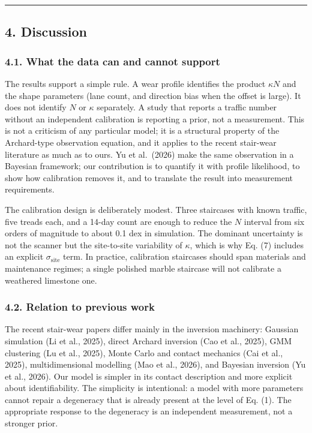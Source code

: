 \documentclass[
]{article}
\begin{document}
\begin{center}\rule{0.5\linewidth}{0.5pt}\end{center}

\subsection{4. Discussion}\label{discussion}

\subsubsection{4.1. What the data can and cannot
support}\label{what-the-data-can-and-cannot-support}

The results support a simple rule. A wear profile identifies the product
\(\kappa N\) and the shape parameters (lane count, and direction bias
when the offset is large). It does not identify \(N\) or \(\kappa\)
separately. A study that reports a traffic number without an independent
calibration is reporting a prior, not a measurement. This is not a
criticism of any particular model; it is a structural property of the
Archard-type observation equation, and it applies to the recent
stair-wear literature as much as to ours. Yu et al.~(2026) make the same
observation in a Bayesian framework; our contribution is to quantify it
with profile likelihood, to show how calibration removes it, and to
translate the result into measurement requirements.

The calibration design is deliberately modest. Three staircases with
known traffic, five treads each, and a 14-day count are enough to reduce
the \(N\) interval from six orders of magnitude to about 0.1 dex in
simulation. The dominant uncertainty is not the scanner but the
site-to-site variability of \(\kappa\), which is why Eq. (7) includes an
explicit \(\sigma_{\mathrm{site}}\) term. In practice, calibration
staircases should span materials and maintenance regimes; a single
polished marble staircase will not calibrate a weathered limestone one.

\subsubsection{4.2. Relation to previous
work}\label{relation-to-previous-work}

The recent stair-wear papers differ mainly in the inversion machinery:
Gaussian simulation (Li et al., 2025), direct Archard inversion (Cao et
al., 2025), GMM clustering (Lu et al., 2025), Monte Carlo and contact
mechanics (Cai et al., 2025), multidimensional modelling (Mao et al.,
2026), and Bayesian inversion (Yu et al., 2026). Our model is simpler in
its contact description and more explicit about identifiability. The
simplicity is intentional: a model with more parameters cannot repair a
degeneracy that is already present at the level of Eq. (1). The
appropriate response to the degeneracy is an independent measurement,
not a stronger prior.
\end{document}
